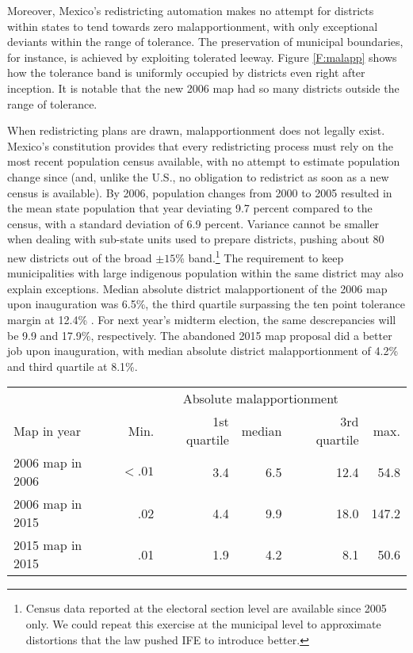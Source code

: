 \documentclass[letter,12pt]{article}
\newcommand{\mc}{\multicolumn}
\begin{document}
Moreover, Mexico's redistricting automation makes no attempt for districts within states to tend towards zero malapportionment, with only exceptional deviants within the range of tolerance. The preservation of municipal boundaries, for instance, is achieved by exploiting tolerated leeway. Figure \ref{F:malapp} shows how the tolerance band is uniformly occupied by districts even right after inception. It is notable that the new 2006 map had so many districts outside the range of tolerance. 

When redistricting plans are drawn, malapportionment does not legally exist. Mexico's constitution provides that every redistricting process must rely on the most recent population census available, with no attempt to estimate population change since (and, unlike the U.S., no obligation to redistrict as soon as a new census is available). By 2006, population changes from 2000 to 2005 resulted in the mean state population that year deviating 9.7 percent compared to the census, with a standard deviation of 6.9 percent. Variance cannot be smaller when dealing with sub-state units used to prepare districts, pushing about 80 new districts out of the broad $\pm 15$\% band.\footnote{Census data reported at the electoral section level are available since 2005 only. We could repeat this exercise at the municipal level to approximate distortions that the law pushed IFE to introduce better.} The requirement to keep municipalities with large indigenous population within the same district may also explain exceptions. Median absolute district malapportionent of the 2006 map upon inauguration was 6.5\%, the third quartile surpassing the ten point tolerance margin at 12.4\% \citep[also,][]{trelles.mtz.tesisItam.2007}. For next year's midterm election, the same descrepancies will be 9.9 and 17.9\%, respectively. The abandoned 2015 map proposal did a better job upon inauguration, with median absolute district malapportionment of 4.2\% and third quartile at 8.1\%. 

\begin{tabular}{lrrrrr}
                 & \mc{5}{c}{Absolute malapportionment} \\
Map in year      & Min. & 1st quartile & median & 3rd quartile & max. \\ \hline
2006 map in 2006 & $<.01$ & 3.4 & 6.5 & 12.4 & 54.8 \\
2006 map in 2015 & .02 & 4.4 & 9.9 & 18.0 & 147.2 \\
2015 map in 2015 & .01 & 1.9 & 4.2 & 8.1 & 50.6 \\
\end{tabular}
\end{document}
